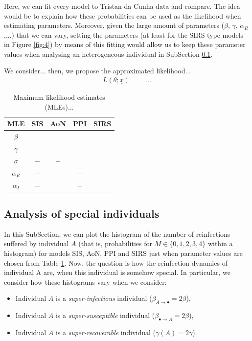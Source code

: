 \documentclass[preprint,12pt]{elsarticle}
\begin{document}
\par Here, we can fit every model to Tristan da Cunha data and compare. The idea would be to explain how these probabilities can be used as the likelihood when estimating parameters. Moreover, given the large amount of parameters ($\beta$, $\gamma$, $\alpha_R$,...) that we can vary, setting the parameters (at least for the SIRS type models in Figure \ref{fig:4}) by means of this fitting would allow us to keep these parameter values when analysing an heterogeneous individual in SubSection \ref{SubSect33}.

\par We consider... then, we propose the approximated likelihood...
\begin{eqnarray*}
L(\theta;{\underline x}) &=& \dots
\end{eqnarray*}

\begin{table}[h!]
{\small
\centering
\begin{tabular}{|c|c|c|c|c|}
\hline
MLE & SIS & AoN & PPI & SIRS\\
\hline
$\beta$ & & & & \\
\hline
$\gamma$ & & & & \\
\hline
$\sigma$ & $-$ & $-$ & & \\
\hline
$\alpha_R$ & $-$ & & $-$ & \\
\hline
$\alpha_I$ & $-$ & & $-$ & \\
\hline
\end{tabular}
\caption{Maximum likelihood estimates (MLEs)...}
\label{tab:tristan}}
\end{table}


\subsection{Analysis of special individuals}
\label{SubSect33}

\par In this SubSection, we can plot the histogram of the number of reinfections suffered by individual $A$ (that is, probabilities for $M\in\{0,1,2,3,4\}$ within a histogram) for models SIS, AoN, PPI and SIRS just when parameter values are chosen from Table \ref{tab:tristan}. Now, the question is how the reinfection dynamics of individual A are, when this individual is somehow special. In particular, we consider how these histograms vary when we consider:
\begin{itemize}
 \item Individual $A$ is a {\it super-infectious} individual ($\beta_{A\rightarrow\bullet}=2\beta$),
 \item Individual $A$ is a {\it super-susceptible} individual ($\beta_{\bullet\rightarrow A}=2\beta$),
 \item Individual $A$ is a {\it super-recoverable} individual ($\gamma(A)=2\gamma$).
\end{itemize}
\end{document}

